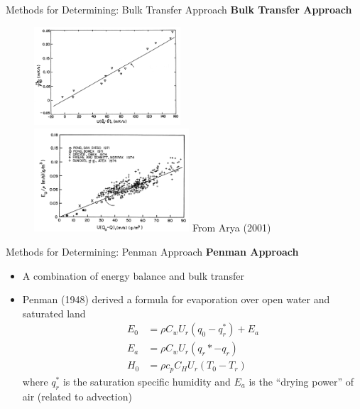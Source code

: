 
\begin{frame}{Methods for Determining: Bulk Transfer Approach}
\textbf{Bulk Transfer Approach}
\begin{figure}
\includegraphics[width=0.485\textwidth]{fig6}
\includegraphics[width=0.515\textwidth]{fig7}
\centering \small From Arya (2001)
\end{figure}

\end{frame}


\begin{frame}{Methods for Determining: Penman Approach}
\textbf{Penman Approach}
\begin{itemize}
	\item A combination of energy balance and bulk transfer
	\item Penman (1948) derived a formula for evaporation over open water and saturated land
	\begin{align*}
	E_0 &= \rho C_w U_r(q_0 - q_r^*) + E_a\\
	E_a &= \rho C_w U_r(q_r* - q_r)\\
	H_0 &= \rho c_p C_H U_r(T_0 - T_r)
	\end{align*}
	where $q_r^*$ is the saturation specific humidity and $E_a$ is the ``drying power'' of air (related to advection)
\end{itemize}
\end{frame}


